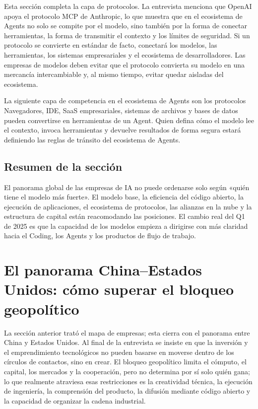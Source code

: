 \documentclass[a4paper]{article}
\begin{document}
Esta sección completa la capa de protocolos. La entrevista menciona que OpenAI apoya el protocolo MCP de Anthropic, lo que muestra que en el ecosistema de Agents no solo se compite por el modelo, sino también por la forma de conectar herramientas, la forma de transmitir el contexto y los límites de seguridad. Si un protocolo se convierte en estándar de facto, conectará los modelos, las herramientas, los sistemas empresariales y el ecosistema de desarrolladores. Las empresas de modelos deben evitar que el protocolo convierta su modelo en una mercancía intercambiable y, al mismo tiempo, evitar quedar aisladas del ecosistema.

\begin{importantbox}{La siguiente capa de competencia en el ecosistema de Agents son los protocolos}
Navegadores, IDE, SaaS empresariales, sistemas de archivos y bases de datos pueden convertirse en herramientas de un Agent. Quien defina cómo el modelo lee el contexto, invoca herramientas y devuelve resultados de forma segura estará definiendo las reglas de tránsito del ecosistema de Agents.
\end{importantbox}

\subsection{Resumen de la sección}

El panorama global de las empresas de IA no puede ordenarse solo según «quién tiene el modelo más fuerte». El modelo base, la eficiencia del código abierto, la ejecución de aplicaciones, el ecosistema de protocolos, las alianzas en la nube y la estructura de capital están reacomodando las posiciones. El cambio real del Q1 de 2025 es que la capacidad de los modelos empieza a dirigirse con más claridad hacia el Coding, los Agents y los productos de flujo de trabajo.
\section{El panorama China–Estados Unidos: cómo superar el bloqueo geopolítico}

La sección anterior trató el mapa de empresas; esta cierra con el panorama entre China y Estados Unidos. Al final de la entrevista se insiste en que la inversión y el emprendimiento tecnológicos no pueden basarse en moverse dentro de los círculos de contactos, sino en crear. El bloqueo geopolítico limita el cómputo, el capital, los mercados y la cooperación, pero no determina por sí solo quién gana; lo que realmente atraviesa esas restricciones es la creatividad técnica, la ejecución de ingeniería, la comprensión del producto, la difusión mediante código abierto y la capacidad de organizar la cadena industrial.
\end{document}
